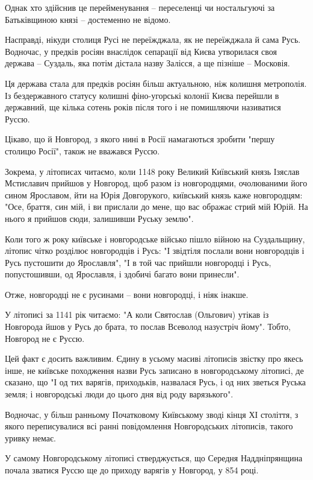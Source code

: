 Однак хто здійснив це перейменування – переселенці чи ностальгуючі за
Батьківщиною князі – достеменно не відомо.

Насправді, нікуди столиця Русі не переїжджала, як не переїжджала й сама Русь.
Водночас, у предків росіян внаслідок сепарації від Києва утворилася своя
держава – Суздаль, яка потім дістала назву Залісся, а ще пізніше – Московія.

Ця держава стала для предків росіян більш актуальною, ніж колишня метрополія.
Із бездержавного статусу колишні фіно-угорські колонії Києва перейшли в
державний, ще кілька сотень років після того і не помишляючи називатися Руссю.

Цікаво, що й Новгород, з якого нині в Росії намагаються зробити "першу столицю
Росії", також не вважався Руссю.

Зокрема, у літописах читаємо, коли 1148 року Великий Київський князь Ізяслав
Мстиславич прийшов у Новгород, щоб разом із новгородцями, очолюваними його
сином Ярославом, йти на Юрія Довгорукого, київський князь каже новгородцям:
"Осе, браття, син мій, і ви прислали до мене, що вас ображає стрий мій Юрій. На
нього я прийшов сюди, залишивши Руську землю".

Коли того ж року київське і новгородське військо пішло війною на Суздальщину,
літопис чітко розділює новгородців і Русь: "І звідтіля послали вони новгородців
і Русь пустошити до Ярославля", "І в той час прийшли новгородці і Русь,
попустошивши, од Ярославля, і здобичі багато вони принесли".

Отже, новгородці не є русинами – вони новгородці, і ніяк інакше.

У літописі за 1141 рік читаємо: "А коли Святослав (Ольгович) утікав із
Новгорода йшов у Русь до брата, то послав Всеволод назустріч йому". Тобто,
Новгород не є Руссю.

Цей факт є досить важливим. Єдину в усьому масиві літописів звістку про якесь
інше, не київське походження назви Русь записано в новгородському літописі, де
сказано, що "І од тих варягів, приходьків, назвалася Русь, і од них зветься
Руська земля; і новгородські люди до цього дня від роду варязького".

Водночас, у більш ранньому Початковому Київському зводі кінця ХІ століття, з
якого переписувалися всі ранні повідомлення Новгородських літописів, такого
уривку немає.

У самому Новгородському літописі стверджується, що Середня Наддніпрянщина
почала зватися Руссю ще до приходу варягів у Новгород, у 854 році.

